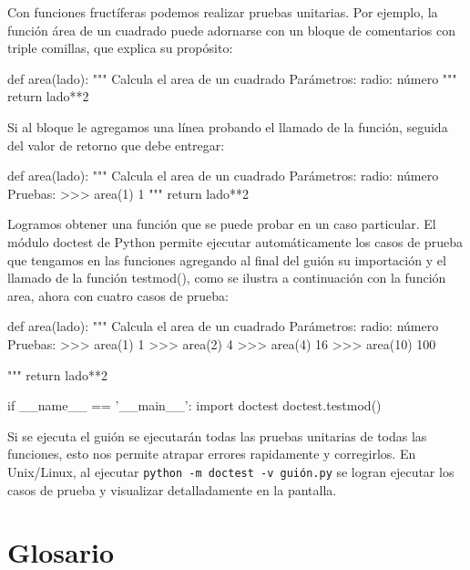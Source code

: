Con funciones fructíferas podemos realizar pruebas unitarias. Por ejemplo, 
la función área de un cuadrado puede adornarse con un bloque 
de comentarios con triple comillas, que explica su propósito:

\beforeverb
\begin{pythoncode}
def area(lado):
    """ Calcula el area de un cuadrado
        Parámetros:
            radio: número
    """
    return lado**2
\end{pythoncode}
\afterverb

Si al bloque le agregamos una línea probando el llamado de la función, 
seguida del valor de retorno que debe entregar:

\beforeverb
\begin{pythoncode}
def area(lado):
    """ Calcula el area de un cuadrado
        Parámetros:
            radio: número
        Pruebas:
        >>> area(1)
        1        
    """
    return lado**2
\end{pythoncode}
\afterverb

Logramos obtener una función que se puede probar en un caso particular. El 
módulo doctest de Python permite ejecutar automáticamente los casos de 
prueba que tengamos en las funciones agregando al final del guión
su importación y el llamado de la función testmod(), como se ilustra a
continuación con la función area, ahora con cuatro casos de prueba:

\beforeverb
\begin{pythoncode}
def area(lado):
    """ Calcula el area de un cuadrado
        Parámetros:
            radio: número
        Pruebas:
        >>> area(1)
        1
        >>> area(2)
        4
        >>> area(4)
        16
        >>> area(10)
        100
        
    """
    return lado**2

if __name__ == '__main__':
    import doctest
    doctest.testmod()
\end{pythoncode}
\afterverb

Si se ejecuta el guión se ejecutarán todas las pruebas unitarias de todas
las funciones, esto nos permite atrapar errores rapidamente y corregirlos. 
En Unix/Linux, al ejecutar \verb+python -m doctest -v guión.py+ se logran 
ejecutar los casos de prueba y visualizar detalladamente en la pantalla.

\section{Glosario}

